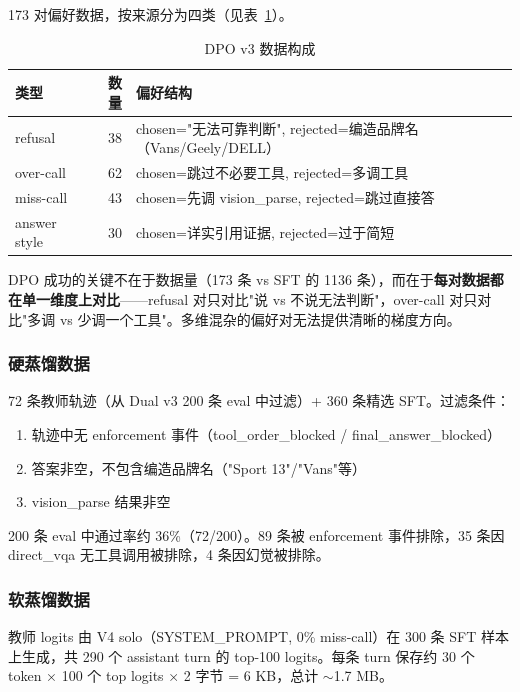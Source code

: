 \documentclass[12pt,a4paper]{ctexart}
\begin{document}
173 对偏好数据，按来源分为四类（见表~\ref{tab:dpo_data}）。

\begin{table}[H]
\centering
\caption{DPO v3 数据构成}
\label{tab:dpo_data}
\begin{tabular}{lrl}
\toprule
类型 & 数量 & 偏好结构 \\
\midrule
refusal & 38 & chosen="无法可靠判断", rejected=编造品牌名（Vans/Geely/DELL） \\
over-call & 62 & chosen=跳过不必要工具, rejected=多调工具 \\
miss-call & 43 & chosen=先调 vision\_parse, rejected=跳过直接答 \\
answer style & 30 & chosen=详实引用证据, rejected=过于简短 \\
\bottomrule
\end{tabular}
\end{table}

DPO 成功的关键不在于数据量（173 条 vs SFT 的 1136 条），而在于\textbf{每对数据都在单一维度上对比}——refusal 对只对比"说 vs 不说无法判断"，over-call 对只对比"多调 vs 少调一个工具"。多维混杂的偏好对无法提供清晰的梯度方向。

\subsubsection{硬蒸馏数据}

72 条教师轨迹（从 Dual v3 200 条 eval 中过滤）+ 360 条精选 SFT。过滤条件：
\begin{enumerate}[nosep]
  \item 轨迹中无 enforcement 事件（tool\_order\_blocked / final\_answer\_blocked）
  \item 答案非空，不包含编造品牌名（"Sport 13"/"Vans"等）
  \item vision\_parse 结果非空
\end{enumerate}

200 条 eval 中通过率约 36\%（72/200）。89 条被 enforcement 事件排除，35 条因 direct\_vqa 无工具调用被排除，4 条因幻觉被排除。

\subsubsection{软蒸馏数据}

教师 logits 由 V4 solo（SYSTEM\_PROMPT, 0\% miss-call）在 300 条 SFT 样本上生成，共 290 个 assistant turn 的 top-100 logits。每条 turn 保存约 30 个 token × 100 个 top logits × 2 字节 = 6 KB，总计 $\sim$1.7 MB。
\end{document}
